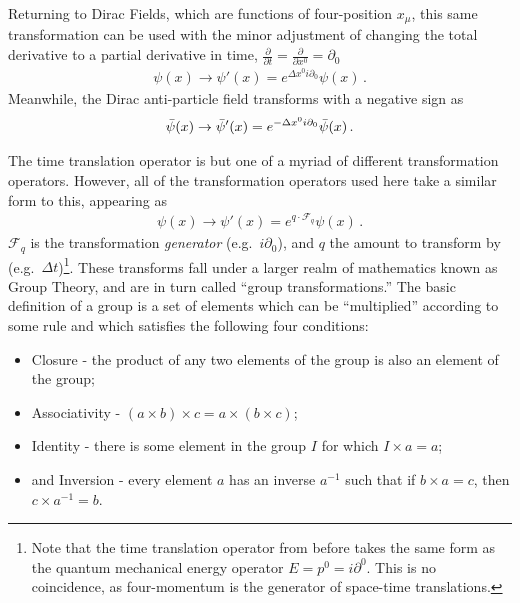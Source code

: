    Returning to Dirac Fields, which are functions of four-position $x_\mu$, this same transformation can be used
         with the minor adjustment of changing the total derivative to a partial derivative in time,
         $\frac{\partial}{\partial t} = \frac{\partial}{\partial x^0} = \partial_0$
    \begin{equation} \begin{split}
    \psi(x) \to \psi'(x) = e^{\Delta x^0 i \partial_0} \psi(x)
    \,.
    \end{split} \end{equation}
    Meanwhile, the Dirac anti-particle field transforms with a negative sign as
    \begin{equation} \begin{split}
    \bar{\psi}(x) \to \bar{\psi}'(x) = e^{-\Delta x^0 i \partial_0} \bar{\psi}(x)
    \,.
    \end{split} \end{equation}
    
    The time translation operator is but one of a myriad of different transformation operators.
    However, all of the transformation operators used here take a similar form to this, appearing as
    \begin{equation} \begin{split}
        \psi(x) \to \psi'(x) = e^{ q \cdot \mathcal{F}_q } \psi(x)
        \,.
    \end{split} \end{equation}
    $\mathcal{F}_q$ is the transformation \textit{generator} (e.g.\ $i\partial_0$),
        and $q$ the amount to transform by (e.g.\ $\Delta t$)\footnote{
            Note that the time translation operator from before takes the same form as the quantum mechanical energy operator
                $E = p^0 = i\partial^0$.
            This is no coincidence, as four-momentum is the generator of space-time translations.
         }.
    These transforms fall under a larger realm of mathematics known as Group Theory,
        and are in turn called ``group transformations.''
    The basic definition of a group is a set of elements which can be ``multiplied'' according to some rule
        and which satisfies the following four conditions\cite{Cheng_book}:
    \begin{itemize}
        \item Closure - the product of any two elements of the group is also an element of the group;
        \item Associativity - $(a \times b)\times c = a\times(b \times c)$;
        \item Identity - there is some element in the group $I$ for which $I \times a=a$;
        \item and Inversion - every element $a$ has an inverse $a^{-1}$ such that if $b \times a = c$,
            then $c \times a^{-1} = b$.
    \end{itemize}

